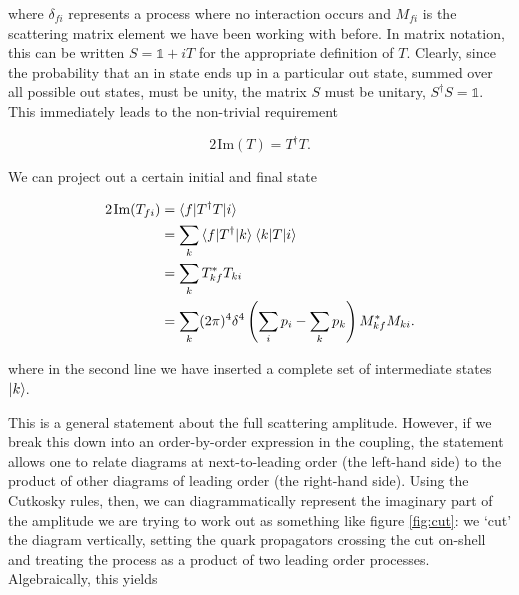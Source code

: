 where $\delta_{fi}$ represents a process where no interaction occurs and $M_{fi}$ is the scattering matrix element we have been working with before. In matrix notation, this can be written $S = \mathbb{1} + i T$ for the appropriate definition of $T$. Clearly, since the probability that an in state ends up in a particular out state, summed over all possible out states, must be unity, the matrix $S$ must be unitary, $S^\dagger S = \mathbb{1}$. This immediately leads to the non-trivial requirement

\begin{equation}
2 \hspace{1pt} \text{Im}(T) = T^\dagger T.
\end{equation}

We can project out a certain initial and final state

\begin{equation}
\begin{split}
2 \hspace{1pt} \text{Im}(T_{fi}) &= \mathinner{\langle f\vert T^\dagger T\vert i\rangle}_{} \\
&= \sum_{k} \mathinner{\langle f\vert T^\dagger\vert k\rangle}_{} \mathinner{\langle k\vert T\vert i\rangle}_{} \\
&= \sum_k T_{kf}^* T_{ki} \\
&= \sum_k (2 \pi)^4 \delta^4 \left(\sum_{i} p_i - \sum_{k} p_k \right) M_{kf}^*M_{ki}.
\end{split}
\end{equation}

where in the second line we have inserted a complete set of intermediate states $\mathinner{\lvert k\rangle}_{\hspace{-0.1em}}$.

This is a general statement about the full scattering amplitude. However, if we break this down into an order-by-order expression in the coupling, the statement allows one to relate diagrams at next-to-leading order (the left-hand side) to the product of other diagrams of leading order (the right-hand side). Using the Cutkosky rules, then, we can diagrammatically represent the imaginary part of the amplitude we are trying to work out as something like figure \ref{fig:cut}: we `cut' the diagram vertically, setting the quark propagators crossing the cut on-shell and treating the process as a product of two leading order processes. Algebraically, this yields

